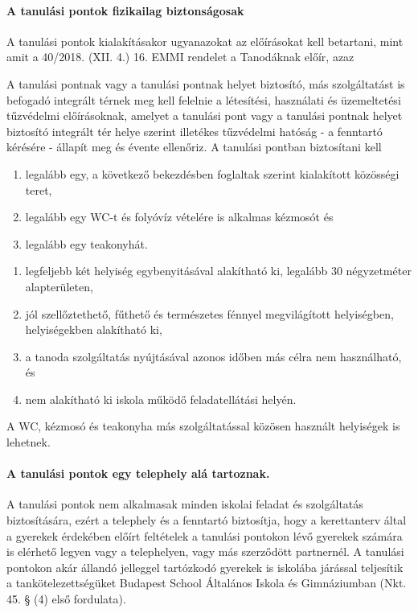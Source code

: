 \paragraph{A tanulási pontok fizikailag biztonságosak}
A tanulási pontok kialakításakor ugyanazokat az előírásokat kell betartani, mint amit a 40/2018. (XII. 4.) 16. EMMI rendelet a Tanodáknak előír, azaz

A tanulási pontnak vagy a tanulási pontnak helyet biztosító, más szolgáltatást is befogadó integrált térnek meg kell felelnie a létesítési, használati és üzemeltetési tűzvédelmi előírásoknak, amelyet a tanulási pont vagy a tanulási pontnak helyet biztosító integrált tér helye szerint illetékes tűzvédelmi hatóság - a fenntartó kérésére - állapít meg és évente ellenőriz. A tanulási pontban biztosítani kell
\begin{enumerate}
    \item legalább egy, a következő bekezdésben foglaltak szerint kialakított közösségi teret,
    \item legalább egy WC-t és folyóvíz vételére is alkalmas kézmosót és
    \item  legalább egy teakonyhát.
\end{enumerate}
\begin{enumerate}
    \item legfeljebb két helyiség egybenyitásával alakítható ki, legalább 30 négyzetméter alapterületen,
    \item jól szellőztethető, fűthető és természetes fénnyel megvilágított helyiségben, helyiségekben alakítható ki,
    \item a tanoda szolgáltatás nyújtásával azonos időben más célra nem használható, és
    \item nem alakítható ki iskola működő feladatellátási helyén.
\end{enumerate}

A WC, kézmosó és teakonyha más szolgáltatással közösen használt helyiségek is lehetnek.

\paragraph{A tanulási pontok egy telephely alá tartoznak.}

A tanulási pontok nem alkalmasak minden iskolai feladat és szolgáltatás biztosítására, ezért a telephely és a fenntartó biztosítja, hogy a kerettanterv által a gyerekek érdekében előírt feltételek a tanulási pontokon lévő gyerekek számára is elérhető legyen vagy a telephelyen, vagy más szerződött partnernél. A tanulási pontokon akár állandó jelleggel tartózkodó gyerekek is iskolába járással teljesítik a tankötelezettségüket Budapest School Általános Iskola és Gimnáziumban (Nkt. 45. § (4) első fordulata).


